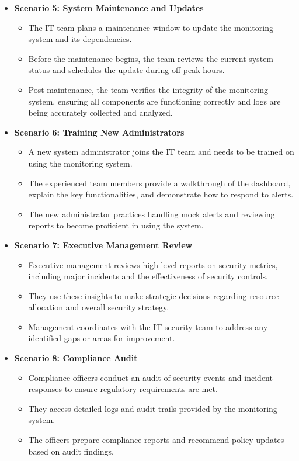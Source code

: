 \documentclass{article}
\begin{document}
\begin{itemize}
        \item \textbf{Scenario 5: System Maintenance and Updates}
        \begin{itemize}
            \item The IT team plans a maintenance window to update the monitoring system and its dependencies.
            \item Before the maintenance begins, the team reviews the current system status and schedules the update during off-peak hours.
            \item Post-maintenance, the team verifies the integrity of the monitoring system, ensuring all components are functioning correctly and logs are being accurately collected and analyzed.
        \end{itemize}

        \item \textbf{Scenario 6: Training New Administrators}
        \begin{itemize}
            \item A new system administrator joins the IT team and needs to be trained on using the monitoring system.
            \item The experienced team members provide a walkthrough of the dashboard, explain the key functionalities, and demonstrate how to respond to alerts.
            \item The new administrator practices handling mock alerts and reviewing reports to become proficient in using the system.
        \end{itemize}

        \item \textbf{Scenario 7: Executive Management Review}
        \begin{itemize}
            \item Executive management reviews high-level reports on security metrics, including major incidents and the effectiveness of security controls.
            \item They use these insights to make strategic decisions regarding resource allocation and overall security strategy.
            \item Management coordinates with the IT security team to address any identified gaps or areas for improvement.
        \end{itemize}

        \item \textbf{Scenario 8: Compliance Audit}
        \begin{itemize}
            \item Compliance officers conduct an audit of security events and incident responses to ensure regulatory requirements are met.
            \item They access detailed logs and audit trails provided by the monitoring system.
            \item The officers prepare compliance reports and recommend policy updates based on audit findings.
        \end{itemize}
    \end{itemize}
\end{document}
